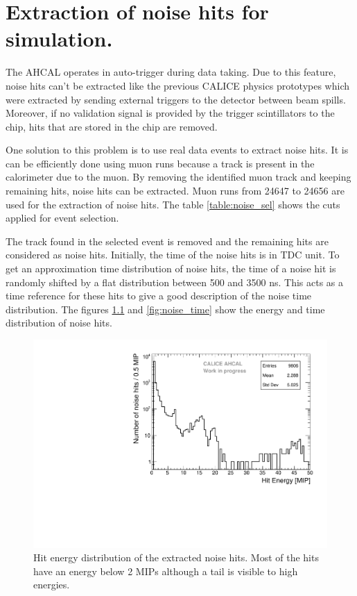 \chapter{Extraction of noise hits for simulation.}
\label{appendix:noise}

The AHCAL operates in auto-trigger during data taking. Due to this feature, noise hits can't be extracted like the previous CALICE physics prototypes which were extracted by sending external triggers to the detector between beam spills. Moreover, if no validation signal is provided by the trigger scintillators to the chip, hits that are stored in the chip are removed.

One solution to this problem is to use real data events to extract noise hits. It is can be efficiently done using muon runs because a track is present in the calorimeter due to the muon. By removing the identified muon track and keeping remaining hits, noise hits can be extracted. Muon runs from 24647 to 24656 are used for the extraction of noise hits. The table \ref{table:noise_sel} shows the cuts applied for event selection.

The track found in the selected event is removed and the remaining hits are considered as noise hits. Initially, the time of the noise hits is in TDC unit. To get an approximation time distribution of noise hits, the time of a noise hit is randomly shifted by a flat distribution between 500 and 3500 ns. This acts as a time reference for these hits to give a good description of the noise time distribution. The figures \ref{fig:noise_energy} and \ref{fig:noise_time} show the energy and time distribution of noise hits.

\begin{figure}[htbp!]
	\centering
	\includegraphics[width=0.7\linewidth]{../Thesis_Plots/Timing/Muons/Plots/Noise_Energy_Flat.pdf}
	\caption{Hit energy distribution of the extracted noise hits. Most of the hits have an energy below 2 MIPs although a tail is visible to high energies.} \label{fig:noise_energy}
\end{figure}

